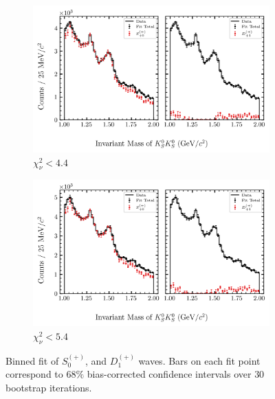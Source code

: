 \begin{figure}[htbp]
    \begin{subfigure}{0.45\textwidth}
        \includegraphics[width=\linewidth]{figures/binned_fit_chisqdof_4.4_splot_D_1s_2b_phase_factor_waves489_uncertainty_bootstrap-CI-BC.png}
        \caption{$\chi^2_\nu < 4.4$}
    \end{subfigure}
    \hfill
    \begin{subfigure}{0.45\textwidth}
        \includegraphics[width=\linewidth]{figures/binned_fit_chisqdof_5.4_splot_D_1s_2b_phase_factor_waves489_uncertainty_bootstrap-CI-BC.png}
        \caption{$\chi^2_\nu < 5.4$}
    \end{subfigure}

    \caption{Binned fit of $S_{0}^{(+)}$, and $D_{1}^{(+)}$ waves. Bars on each fit point correspond to $68\%$ bias-corrected confidence intervals over $ 30 $ bootstrap iterations.}
    \label{fig:binned-fit-all-Sp-D1p}
\end{figure}

